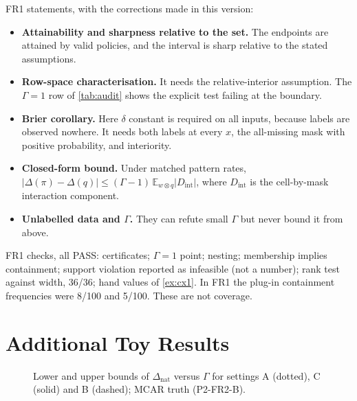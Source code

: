 \documentclass{article}
\theoremstyle{plain}
\theoremstyle{definition}
\theoremstyle{remark}
\newcommand{\Dnat}{\Delta_{\mathrm{nat}}}
\begin{document}
FR1 statements, with the corrections made in this version:
\begin{itemize}
\item \textbf{Attainability and sharpness relative to the set.} The
endpoints are attained by valid policies, and the interval is sharp relative
to the stated assumptions.
\item \textbf{Row-space characterisation.} It needs the relative-interior
assumption. The $\Gamma=1$ row of \cref{tab:audit} shows the explicit test
failing at the boundary.
\item \textbf{Brier corollary.} Here $\delta$ constant is required on all
inputs, because labels are observed nowhere. It needs both labels at every
$x$, the all-missing mask with positive probability, and interiority.
\item \textbf{Closed-form bound.} Under matched pattern rates,
$|\Delta(\pi)-\Delta(q)|\le(\Gamma-1)\,\mathbb{E}_{w\otimes q}|D_{\mathrm{int}}|$,
where $D_{\mathrm{int}}$ is the cell-by-mask interaction component.
\item \textbf{Unlabelled data and $\Gamma$.} They can refute small $\Gamma$
but never bound it from above.
\end{itemize}
FR1 checks, all PASS: certificates; $\Gamma=1$ point; nesting; membership
implies containment; support violation reported as infeasible (not a
number); rank test against width, 36/36; hand values of \cref{ex:cx1}. In
FR1 the plug-in containment frequencies were 8/100 and 5/100. These are not
coverage.

\section{Additional Toy Results}
\label{app:extra}
\begin{figure}[t]
\centering
{}
\caption{Lower and upper bounds of $\Dnat$ versus $\Gamma$ for settings A
(dotted), C (solid) and B (dashed); MCAR truth (P2-FR2-B).}
\label{fig:fr2}
\end{figure}
\end{document}
